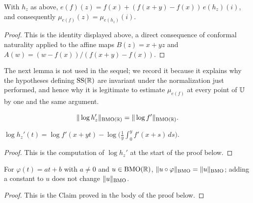 \begin{lemma}\label{lem:de_normalization}
	With $h_z$ as above, $e(f)(z)=f(x)+(f(x+y)-f(x))\,e(h_z)(i)$, and consequently
	$\mu_{e(f)}(z)=\mu_{e(h_z)}(i)$.
\end{lemma}
\begin{proof}
	This is the identity displayed above, a direct consequence of conformal naturality
	applied to the affine maps $B(z)=x+yz$ and $A(w)=(w-f(x))/(f(x+y)-f(x))$.
\end{proof}


The next lemma is not used in the sequel; we record it because it explains why
the hypotheses defining $\mathrm{SS}(\mathbb{R})$ are invariant under the normalization just
performed, and hence why it is legitimate to estimate $\mu_{e(f)}$ at every
point of $\mathbb{U}$ by one and the same argument.

\begin{lemma}\label{lem:bmo-scale}
	\[
	\|\log h_z'\|_{\mathrm{BMO}(\mathbb{R})} = \|\log f'\|_{\mathrm{BMO}(\mathbb{R})}.
	\]
\end{lemma}

\begin{lemma}\label{lem:normalizedMap_log_deriv}
	\leanok
	$\log h_z'(t)=\log f'(x+yt)-\log\bigl(\tfrac1y\int_0^yf'(x+s)\,ds\bigr)$.
\end{lemma}
\begin{proof}
	This is the computation of $\log h_z'$ at the start of the proof below.
\end{proof}

\begin{lemma}\label{lem:bmoNorm_comp_affine}
	\leanok
	For $\varphi(t)=at+b$ with $a\ne0$ and $u\in\mathrm{BMO}(\mathbb{R})$, $\|u\circ\varphi\|_{\mathrm{BMO}}=\|u\|_{\mathrm{BMO}}$;
	adding a constant to $u$ does not change $\|u\|_{\mathrm{BMO}}$.
\end{lemma}
\begin{proof}
	This is the Claim proved in the body of the proof below.
\end{proof}

